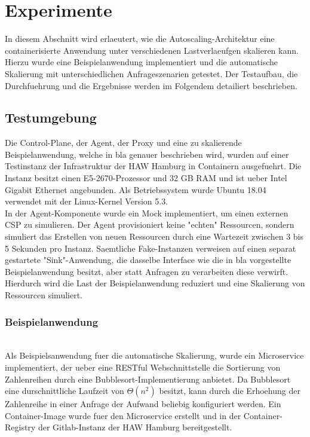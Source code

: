 \documentclass[runningheads]{llncs}
\begin{document}

\section{Experimente}

In diesem Abschnitt wird erlaeutert, wie die Autoscaling-Architektur eine containerisierte Anwendung unter verschiedenen Lastverlaeufgen skalieren kann. Hierzu wurde eine Beispielanwendung implementiert und die automatische Skalierung mit unterschiedlichen Anfrageszenarien getestet. Der Testaufbau, die Durchfuehrung und die Ergebnisse werden im Folgendem detailiert beschrieben.

\subsection{Testumgebung}

Die Control-Plane, der Agent, der Proxy und eine zu skalierende Beispielanwendung, welche in bla genauer beschrieben wird, wurden auf einer Testinstanz der Infrastruktur der HAW Hamburg in Containern ausgefuehrt. Die Instanz besitzt einen E5-2670-Prozessor und 32 GB RAM und ist ueber Intel Gigabit Ethernet angebunden. Als Betriebssystem wurde Ubuntu 18.04 verwendet mit der Linux-Kernel Version 5.3. \\

In der Agent-Komponente wurde ein Mock implementiert, um einen externen CSP zu simulieren. Der Agent provisioniert keine "echten" Ressourcen, sondern simuliert das Erstellen von neuen Ressourcen durch eine Wartezeit zwischen 3 bis 5 Sekunden pro Instanz. Saemtliche Fake-Instanzen verweisen auf einen separat gestartete "Sink"-Anwendung, die dasselbe Interface wie die in bla vorgestellte Beispielanwendung besitzt, aber statt Anfragen zu verarbeiten diese verwirft. Hierdurch wird die Last der Beispielanwendung reduziert und eine Skalierung von Ressourcen simuliert.

\subsubsection{Beispielanwendung} \hfill\\

Als Beispielsanwendung fuer die automatische Skalierung, wurde ein Microservice implementiert, der ueber eine RESTful Webschnittstelle die Sortierung von Zahlenreihen durch eine Bubblesort-Implementierung anbietet. Da Bubblesort eine durschnittliche Laufzeit von $\Theta \left( n^{2}\right)$ besitzt, kann durch die Erhoehung der Zahlenreihe in einer Anfrage der Aufwand beliebig konfiguriert werden. Ein Container-Image wurde fuer den Microservice erstellt und in der Container-Registry der Gitlab-Instanz der HAW Hamburg bereitgestellt.
\end{document}
